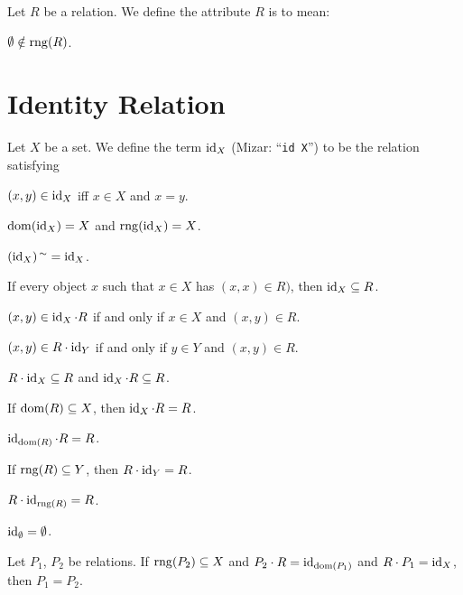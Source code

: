 \documentclass{article}
\begin{document}
\begin{definition}
Let $R$ be a relation.
We define the attribute $R$ is  to mean:
\begin{defn}
\item $\emptyset\notin\operatorname{rng}(R)$.
\end{defn}
\end{definition}


\section{Identity Relation}

\begin{definition}
Let $X$ be a set. We define the term $\operatorname{id}_{X}$ (Mizar: ``\verb#id X#'')
to be the relation satisfying
\begin{defn}
\item $(x,y)\in\operatorname{id}_{X}$ iff $x\in X$ and $x=y$.
\end{defn}
\end{definition}

\begin{thm}
\item\label{relat1:45} $\operatorname{dom}(\operatorname{id}_{X})=X$ and $\operatorname{rng}(\operatorname{id}_{X})=X$.
\item\label{relat1:46} $(\operatorname{id}_{X})^{\,\sim}=\operatorname{id}_{X}$.
\item\label{relat1:47} If every object $x$ such that $x\in X$ has
  $(x,x)\in R)$, then $\operatorname{id}_{X}\subseteq R$.
\item\label{relat1:48} $(x,y)\in\operatorname{id}_{X}\cdot R$ if and only if $x\in X$
  and $(x,y)\in R$.
\item\label{relat1:49} $(x,y)\in R\cdot\operatorname{id}_{Y}$ if and only if $y\in Y$
  and $(x,y)\in R$.
\item\label{relat1:50} $R\cdot\operatorname{id}_{X}\subseteq R$ and $\operatorname{id}_{X}\cdot R\subseteq R$.
\item\label{relat1:51} If $\operatorname{dom}(R)\subseteq X$, then $\operatorname{id}_{X}\cdot R=R$.
\item\label{relat1:52} $\operatorname{id}_{\operatorname{dom}(R)}\cdot R=R$.
\item\label{relat1:53} If $\operatorname{rng}(R)\subseteq Y$, then $R\cdot\operatorname{id}_{Y}=R$.
\item\label{relat1:54} $R\cdot\operatorname{id}_{\operatorname{rng}(R)}=R$.
\item\label{relat1:55} $\operatorname{id}_{\emptyset}=\emptyset$.
\item\label{relat1:56} Let $P_{1}$, $P_{2}$ be relations.
  If $\operatorname{rng}(P_{2})\subseteq X$ and $P_{2}\cdot R = \operatorname{id}_{\operatorname{dom}(P_{1})}$
  and $R\cdot P_{1}=\operatorname{id}_{X}$,
  then $P_{1}=P_{2}$.
\end{thm}
\end{document}
